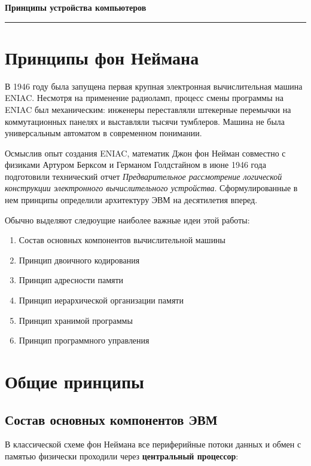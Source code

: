 \documentclass[11pt,a4paper]{article}
\begin{document}
\begin{center}
    {\LARGE \textbf{Принципы устройства компьютеров}}\\[0.2cm]
    \rule{\textwidth}{1pt}
\end{center}

\section{Принципы фон Неймана}

В 1946 году была запущена первая крупная электронная вычислительная машина ENIAC. Несмотря на применение радиоламп, процесс смены программы на ENIAC был механическим: инженеры переставляли штекерные перемычки на коммутационных панелях и выставляли тысячи тумблеров. Машина не была универсальным автоматом в современном понимании.

Осмыслив опыт создания ENIAC, математик Джон фон Нейман совместно с физиками Артуром Берксом и Германом Голдстайном в июне 1946 года подготовили технический отчет \textit{\guillemotleft Предварительное рассмотрение логической конструкции электронного вычислительного устройства\guillemotright}. Сформулированные в нем принципы определили архитектуру ЭВМ на десятилетия вперед.

Обычно выделяют следюущие наиболее важные идеи этой работы:
\begin{enumerate}
    \item Состав основных компонентов вычислительной машины
    \item Принцип двоичного кодирования
    \item Принцип адресности памяти
    \item Принцип иерархической организации памяти
    \item Принцип хранимой программы
    \item Принцип программного управления
\end{enumerate}

\section{Общие принципы}

\subsection{Состав основных компонентов ЭВМ}
В классической схеме фон Неймана все периферийные потоки данных и обмен с памятью физически проходили через \textbf{центральный процессор}:
\end{document}
